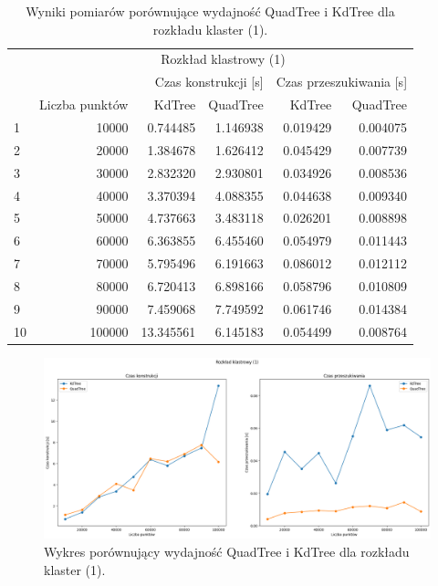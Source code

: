 \documentclass{lab}
\begin{document}
\begin{table}[H]
\centering
\begin{tabular}{lrrrrr}
  \toprule
   & \multicolumn{5}{c}{Rozkład klastrowy (1)} \\
   &  & \multicolumn{2}{r}{Czas konstrukcji [s]} & \multicolumn{2}{r}{Czas przeszukiwania [s]} \\
   & Liczba punktów & KdTree & QuadTree & KdTree & QuadTree \\
  \midrule
1 & 10000 & 0.744485 & 1.146938 & 0.019429 & 0.004075 \\
2 & 20000 & 1.384678 & 1.626412 & 0.045429 & 0.007739 \\
3 & 30000 & 2.832320 & 2.930801 & 0.034926 & 0.008536 \\
4 & 40000 & 3.370394 & 4.088355 & 0.044638 & 0.009340 \\
5 & 50000 & 4.737663 & 3.483118 & 0.026201 & 0.008898 \\
6 & 60000 & 6.363855 & 6.455460 & 0.054979 & 0.011443 \\
7 & 70000 & 5.795496 & 6.191663 & 0.086012 & 0.012112 \\
8 & 80000 & 6.720413 & 6.898166 & 0.058796 & 0.010809 \\
9 & 90000 & 7.459068 & 7.749592 & 0.061746 & 0.014384 \\
10 & 100000 & 13.345561 & 6.145183 & 0.054499 & 0.008764 \\
  \bottomrule
  \end{tabular}
\caption{Wyniki pomiarów porównujące wydajność QuadTree i KdTree dla rozkładu klaster (1).}
\label{tab:cluster_time_1}
\end{table}

\begin{figure}[H]
  \centering
  \includegraphics[width=1\textwidth]{resources/cluster_graph_1.png}
  \caption{Wykres porównujący wydajność QuadTree i KdTree dla rozkładu klaster (1).}
  \label{fig:cluster_graph_1}
\end{figure}
\end{document}
